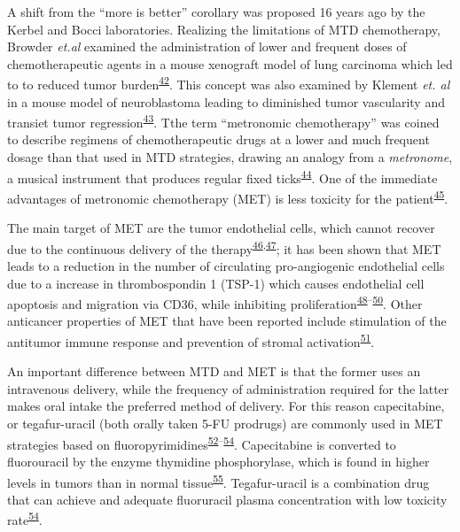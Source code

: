 \documentclass[11pt]{umnthesis}
\begin{document}
A shift from the ``more is better'' corollary was proposed 16 years ago by the Kerbel and Bocci laboratories. Realizing the limitations of MTD chemotherapy, Browder \emph{et.al} examined the administration of lower and frequent doses of chemotherapeutic agents in a mouse xenograft model of lung carcinoma which led to to reduced tumor burden\textsuperscript{\protect\hyperlink{ref-browder2000}{42}}. This concept was also examined by Klement \emph{et. al} in a mouse model of neuroblastoma leading to diminished tumor vascularity and transiet tumor regression\textsuperscript{\protect\hyperlink{ref-klement2000}{43}}. Tthe term ``metronomic chemotherapy'' was coined to describe regimens of chemotherapeutic drugs at a lower and much frequent dosage than that used in MTD strategies, drawing an analogy from a \emph{metronome}, a musical instrument that produces regular fixed ticks\textsuperscript{\protect\hyperlink{ref-maiti2014}{44}}. One of the immediate advantages of metronomic chemotherapy (MET) is less toxicity for the patient\textsuperscript{\protect\hyperlink{ref-natale2017}{45}}.

The main target of MET are the tumor endothelial cells, which cannot recover due to the continuous delivery of the therapy\textsuperscript{\protect\hyperlink{ref-kerbel2004}{46},\protect\hyperlink{ref-genfors2016}{47}}; it has been shown that MET leads to a reduction in the number of circulating pro-angiogenic endothelial cells due to a increase in thrombospondin 1 (TSP-1) which causes endothelial cell apoptosis and migration via CD36, while inhibiting proliferation\textsuperscript{\protect\hyperlink{ref-stoelting2008}{48}--\protect\hyperlink{ref-bocci2003}{50}}. Other anticancer properties of MET that have been reported include stimulation of the antitumor immune response and prevention of stromal activation\textsuperscript{\protect\hyperlink{ref-andre2017}{51}}.

An important difference between MTD and MET is that the former uses an intravenous delivery, while the frequency of administration required for the latter makes oral intake the preferred method of delivery. For this reason capecitabine, or tegafur-uracil (both orally taken 5-FU prodrugs) are commonly used in MET strategies based on fluoropyrimidines\textsuperscript{\protect\hyperlink{ref-alagizy2015}{52}--\protect\hyperlink{ref-huang2017}{54}}. Capecitabine is converted to fluorouracil by the enzyme thymidine phosphorylase, which is found in higher levels in tumors than in normal tissue\textsuperscript{\protect\hyperlink{ref-walko2005}{55}}. Tegafur-uracil is a combination drug that can achieve and adequate fluoruracil plasma concentration with low toxicity rate\textsuperscript{\protect\hyperlink{ref-huang2017}{54}}.
\end{document}
